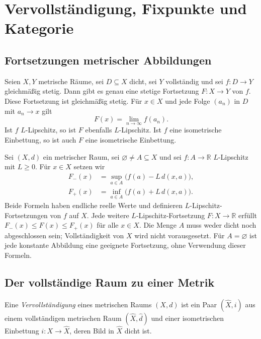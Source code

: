 \chapter{Vervollständigung, Fixpunkte und Kategorie}
\label{b47guide:ch:completion-fixed-points}

\section{Fortsetzungen metrischer Abbildungen}

\begin{theorem}
\label{b47guide:thm:uniform-extension}
Seien $X,Y$ metrische Räume, sei $D\subseteq X$ dicht, sei $Y$ vollständig und sei
$f:D\to Y$ gleichmäßig stetig. Dann gibt es genau eine stetige
Fortsetzung $F:X\to Y$ von $f$. Diese Fortsetzung ist gleichmäßig
stetig. Für $x\in X$ und jede Folge $(a_n)$ in $D$ mit $a_n\to x$ gilt
\[
 F(x)=\lim_{n\to\infty}f(a_n).
\]
Ist $f$ $L$-Lipschitz, so ist $F$ ebenfalls $L$-Lipschitz.
Ist $f$ eine isometrische Einbettung, so ist auch $F$ eine
isometrische Einbettung.
\cite{baire-notes}
\end{theorem}
\begin{theorem}
\label{b47guide:thm:mcshane-whitney}
Sei $(X,d)$ ein metrischer Raum, sei $\varnothing\ne A\subseteq X$ und
sei $f:A\to\mathbb R$ $L$-Lipschitz mit $L\geq0$. Für $x\in X$ setzen wir
\[
\begin{aligned}
 F_-(x)&=\sup_{a\in A}\bigl(f(a)-L\,d(x,a)\bigr),\\
 F_+(x)&=\inf_{a\in A}\bigl(f(a)+L\,d(x,a)\bigr).
\end{aligned}
\]
Beide Formeln haben endliche reelle Werte und definieren
$L$-Lipschitz-Fortsetzungen von $f$ auf $X$.
Jede weitere $L$-Lipschitz-Fortsetzung $F:X\to\mathbb R$ erfüllt
$F_-(x)\leq F(x)\leq F_+(x)$ für alle $x\in X$.
Die Menge $A$ muss weder dicht noch abgeschlossen sein; Vollständigkeit
von $X$ wird nicht vorausgesetzt. Für $A=\varnothing$ ist jede konstante
Abbildung eine geeignete Fortsetzung, ohne Verwendung dieser Formeln.
\cite{lipschitz-extension}
\end{theorem}
\section{Der vollständige Raum zu einer Metrik}

\begin{definition}[Vervollständigung]
\label{b47guide:def:completion}
Eine \emph{Vervollständigung} eines metrischen Raums $(X,d)$ ist ein
Paar $(\widehat X,i)$ aus einem vollständigen metrischen Raum
$(\widehat X,\widehat d)$ und einer isometrischen Einbettung
$i:X\to\widehat X$, deren Bild in $\widehat X$ dicht ist.
\end{definition}

